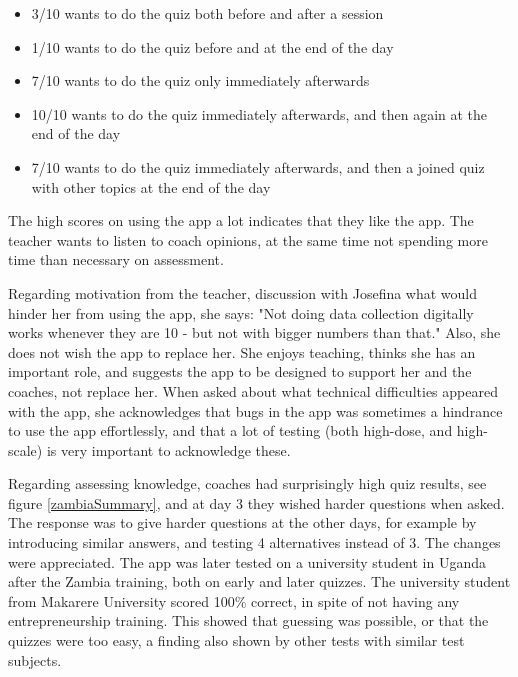 


    \begin{itemize}
    \item 3/10 wants to do the quiz both before and after a session
    \item 1/10 wants to do the quiz before and at the end of the day
    \item 7/10 wants to do the quiz only immediately afterwards
    \item 10/10 wants to do the quiz immediately afterwards, and then again at the end of the day
    \item 7/10 wants to do the quiz immediately afterwards, and then a joined quiz with other topics at the end of the day
    \end{itemize}

    The high scores on using the app a lot indicates that they like the app. The teacher wants to listen to coach opinions, at the same time not spending more time than necessary on assessment.

    Regarding motivation from the teacher, discussion with Josefina what would hinder her from using the app, she says: "Not doing data collection digitally works whenever they are 10 - but not with bigger numbers than that." Also, she does not wish the app to replace her. She enjoys teaching, thinks she has an important role, and suggests the app to be designed to support her and the coaches, not replace her. When asked about what technical difficulties appeared with the app, she acknowledges that bugs in the app was sometimes a hindrance to use the app effortlessly, and that a lot of testing (both high-dose, and high-scale) is very important to acknowledge these.

    Regarding assessing knowledge, coaches had surprisingly high quiz results, see figure \ref{zambiaSummary}, and at day 3 they wished harder questions when asked. The response was to give harder questions at the other days, for example by introducing similar answers, and testing 4 alternatives instead of 3. The changes were appreciated. The app was later tested on a university student in Uganda after the Zambia training, both on early and later quizzes. The university student from Makarere University scored 100\% correct, in spite of not having any entrepreneurship training. This showed that guessing was possible, or that the quizzes were too easy, a finding also shown by other tests with similar test subjects.

